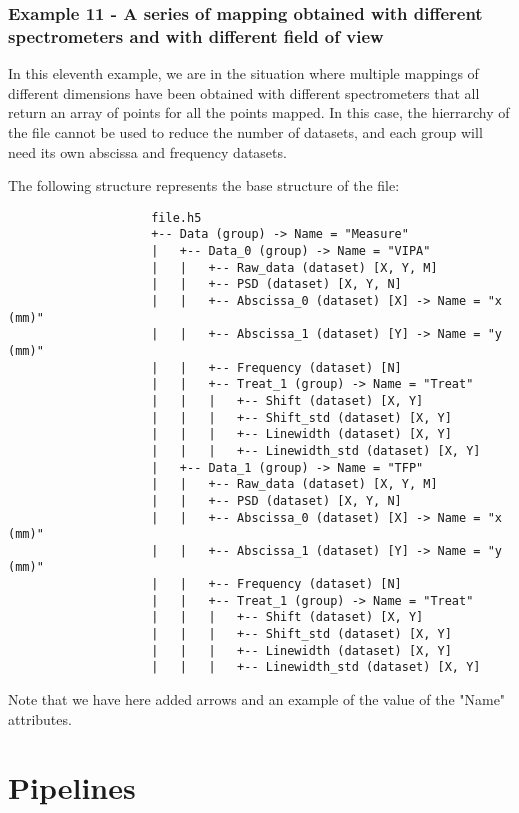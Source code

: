 \documentclass{article}
\begin{document}
        \subsubsection{Example 11 - A series of mapping obtained with different spectrometers and with different field of view}
            In this eleventh example, we are in the situation where multiple mappings of different dimensions have been obtained with different spectrometers that all return an array of points for all the points mapped. In this case, the hierrarchy of the file cannot be used to reduce the number of datasets, and each group will need its own abscissa and frequency datasets.

                The following structure represents the base structure of the file:
                \begin{verbatim}
                    file.h5
                    +-- Data (group) -> Name = "Measure"
                    |   +-- Data_0 (group) -> Name = "VIPA"
                    |   |   +-- Raw_data (dataset) [X, Y, M]
                    |   |   +-- PSD (dataset) [X, Y, N]
                    |   |   +-- Abscissa_0 (dataset) [X] -> Name = "x (mm)"
                    |   |   +-- Abscissa_1 (dataset) [Y] -> Name = "y (mm)"
                    |   |   +-- Frequency (dataset) [N]
                    |   |   +-- Treat_1 (group) -> Name = "Treat"
                    |   |   |   +-- Shift (dataset) [X, Y]
                    |   |   |   +-- Shift_std (dataset) [X, Y]
                    |   |   |   +-- Linewidth (dataset) [X, Y]
                    |   |   |   +-- Linewidth_std (dataset) [X, Y]
                    |   +-- Data_1 (group) -> Name = "TFP"
                    |   |   +-- Raw_data (dataset) [X, Y, M]
                    |   |   +-- PSD (dataset) [X, Y, N]
                    |   |   +-- Abscissa_0 (dataset) [X] -> Name = "x (mm)"
                    |   |   +-- Abscissa_1 (dataset) [Y] -> Name = "y (mm)"
                    |   |   +-- Frequency (dataset) [N]
                    |   |   +-- Treat_1 (group) -> Name = "Treat"
                    |   |   |   +-- Shift (dataset) [X, Y]
                    |   |   |   +-- Shift_std (dataset) [X, Y]
                    |   |   |   +-- Linewidth (dataset) [X, Y]
                    |   |   |   +-- Linewidth_std (dataset) [X, Y]
                \end{verbatim}
                Note that we have here added arrows and an example of the value of the "Name" attributes.
            

\section{Pipelines}
   
\end{document}
